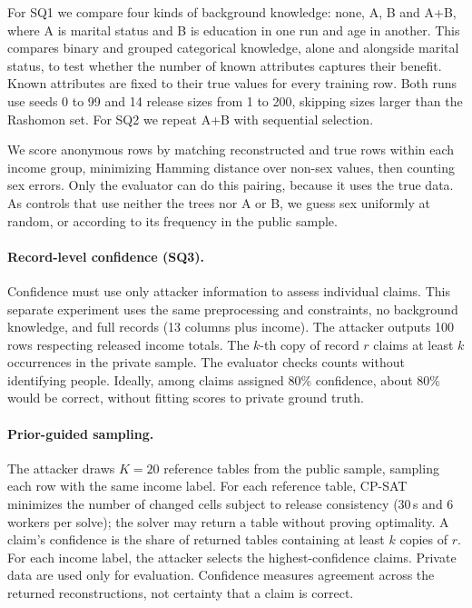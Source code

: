   For SQ1 we compare four kinds of background knowledge: none, A, B and A+B, where A is
  marital status and B is education in one run and age in another. This compares binary and grouped categorical knowledge, alone and alongside
  marital status, to test whether the number of known attributes captures their benefit. Known attributes are fixed to their true values for every training row. Both runs use seeds 0 to 99 and 14 release sizes from 1 to 200, skipping sizes
  larger than the Rashomon set. For SQ2 we repeat A+B with sequential selection.

  We score anonymous rows by matching reconstructed and true rows within each income
  group, minimizing Hamming distance over non-sex values, then counting sex errors. Only the evaluator can do this pairing, because it uses the true data. As controls that use neither the trees nor A or
  B, we guess sex uniformly at random, or according to its frequency in the public sample.

\paragraph{Record-level confidence (SQ3).} Confidence must use only attacker information to assess individual claims.
  This separate experiment uses the same preprocessing and constraints, no background
  knowledge, and full records (13 columns plus income). The attacker outputs 100 rows
  respecting released income totals.
  The $k$-th copy of record $r$ claims at least $k$ occurrences in the private sample.
  The evaluator checks counts without identifying people. Ideally, among claims assigned 80\%
  confidence, about 80\% would be correct, without fitting scores to private ground truth.

\paragraph{Prior-guided sampling.} The attacker draws $K=20$ reference tables from the
  public sample, sampling each row with the same income label. For each reference table,
  CP-SAT minimizes the number of changed cells subject to release consistency (30\,s and
  6 workers per solve); the solver may return a table without proving optimality. A claim's confidence
  is the share of returned tables containing at least $k$ copies of $r$. For each income
  label, the attacker selects the highest-confidence claims. Private data are used only
  for evaluation. Confidence measures agreement across the returned reconstructions, not certainty
  that a claim is correct.

